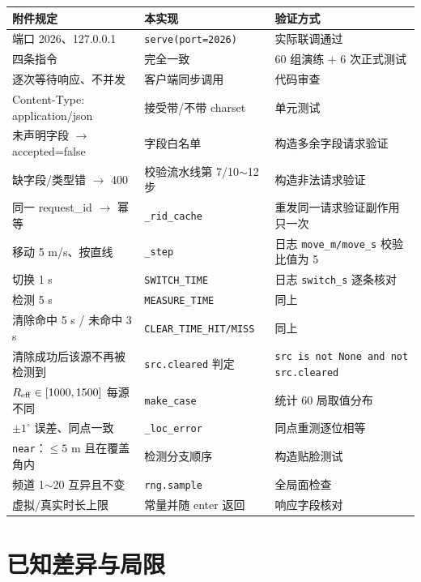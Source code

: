 \begin{longtable}{p{5.2cm}p{4.6cm}p{5.0cm}}
\toprule
附件规定 & 本实现 & 验证方式 \\ \midrule
\endhead
端口 2026、127.0.0.1 & \texttt{serve(port=2026)} & 实际联调通过 \\
四条指令 & 完全一致 & 60 组演练 $+$ 6 次正式测试 \\
逐次等待响应、不并发 & 客户端同步调用 & 代码审查 \\
Content-Type: application/json & 接受带/不带 charset & 单元测试 \\
未声明字段 $\to$ accepted=false & 字段白名单 & 构造多余字段请求验证 \\
缺字段/类型错 $\to$ 400 & 校验流水线第 7/10$\sim$12 步 & 构造非法请求验证 \\
同一 request\_id $\to$ 幂等 & \texttt{\_rid\_cache} & 重发同一请求验证副作用只一次 \\
移动 5 m/s、按直线 & \texttt{\_step} & 日志 \texttt{move\_m/move\_s} 校验比值为 5 \\
切换 1 s & \texttt{SWITCH\_TIME} & 日志 \texttt{switch\_s} 逐条核对 \\
检测 5 s & \texttt{MEASURE\_TIME} & 同上 \\
清除命中 5 s / 未命中 3 s & \texttt{CLEAR\_TIME\_HIT/MISS} & 同上 \\
清除成功后该源不再被检测到 & \texttt{src.cleared} 判定 & \texttt{src is not None and not src.cleared} \\
$R_{\rm eff}\in[1000,1500]$ 每源不同 & \texttt{make\_case} & 统计 60 局取值分布 \\
$\pm1^{\circ}$ 误差、同点一致 & \texttt{\_loc\_error} & 同点重测逐位相等 \\
\texttt{near}：$\le5$ m 且在覆盖角内 & 检测分支顺序 & 构造贴脸测试 \\
频道 1$\sim$20 互异且不变 & \texttt{rng.sample} & 全局面检查 \\
虚拟/真实时长上限 & 常量并随 enter 返回 & 响应字段核对 \\
\bottomrule
\end{longtable}

\section{已知差异与局限}

